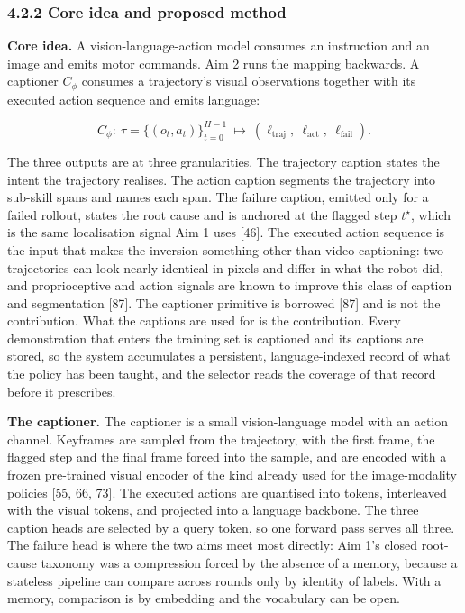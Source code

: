 \documentclass[
  11pt,
]{article}
\begin{document}
\hypertarget{core-idea-and-proposed-method}{%
\subsubsection{4.2.2 Core idea and proposed
method}\label{core-idea-and-proposed-method}}

\textbf{Core idea.} A vision-language-action model consumes an
instruction and an image and emits motor commands. Aim 2 runs the
mapping backwards. A captioner \(C_\phi\) consumes a trajectory's visual
observations together with its executed action sequence and emits
language:

\[C_\phi:\ \tau = \{(o_t, a_t)\}_{t=0}^{H-1} \ \longmapsto\ (\ell_{\text{traj}},\ \ell_{\text{act}},\ \ell_{\text{fail}}). \tag{12}\]

The three outputs are at three granularities. The trajectory caption
states the intent the trajectory realises. The action caption segments
the trajectory into sub-skill spans and names each span. The failure
caption, emitted only for a failed rollout, states the root cause and is
anchored at the flagged step \(t^\star\), which is the same localisation
signal Aim 1 uses {[}46{]}. The executed action sequence is the input
that makes the inversion something other than video captioning: two
trajectories can look nearly identical in pixels and differ in what the
robot did, and proprioceptive and action signals are known to improve
this class of caption and segmentation {[}87{]}. The captioner primitive
is borrowed {[}87{]} and is not the contribution. What the captions are
used for is the contribution. Every demonstration that enters the
training set is captioned and its captions are stored, so the system
accumulates a persistent, language-indexed record of what the policy has
been taught, and the selector reads the coverage of that record before
it prescribes.

\textbf{The captioner.} The captioner is a small vision-language model
with an action channel. Keyframes are sampled from the trajectory, with
the first frame, the flagged step and the final frame forced into the
sample, and are encoded with a frozen pre-trained visual encoder of the
kind already used for the image-modality policies {[}55, 66, 73{]}. The
executed actions are quantised into tokens, interleaved with the visual
tokens, and projected into a language backbone. The three caption heads
are selected by a query token, so one forward pass serves all three. The
failure head is where the two aims meet most directly: Aim 1's closed
root-cause taxonomy was a compression forced by the absence of a memory,
because a stateless pipeline can compare across rounds only by identity
of labels. With a memory, comparison is by embedding and the vocabulary
can be open.
\end{document}
